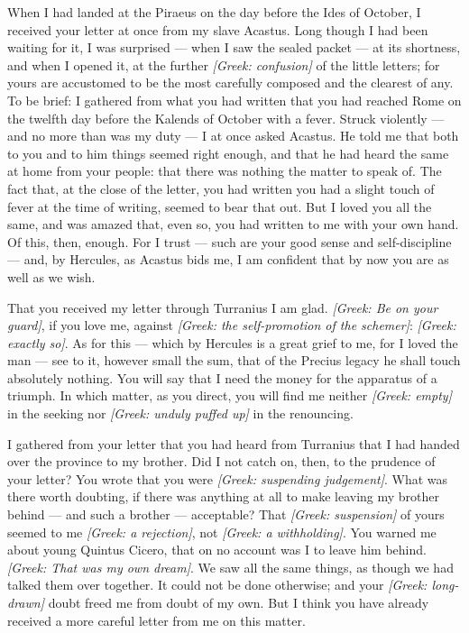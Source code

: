 

 When I had landed at the Piraeus on the day before the Ides of October, I received your letter at once from my slave Acastus. Long though I had been waiting for it, I was surprised --- when I saw the sealed packet --- at its shortness, and when I opened it, at the further \textit{[Greek: confusion]} of the little letters; for yours are accustomed to be the most carefully composed and the clearest of any. To be brief: I gathered from what you had written that you had reached Rome on the twelfth day before the Kalends of October with a fever. Struck violently --- and no more than was my duty --- I at once asked Acastus. He told me that both to you and to him things seemed right enough, and that he had heard the same at home from your people: that there was nothing the matter to speak of. The fact that, at the close of the letter, you had written you had a slight touch of fever at the time of writing, seemed to bear that out. But I loved you all the same, and was amazed that, even so, you had written to me with your own hand. Of this, then, enough. For I trust --- such are your good sense and self-discipline --- and, by Hercules, as Acastus bids me, I am confident that by now you are as well as we wish.

 That you received my letter through Turranius I am glad. \textit{[Greek: Be on your guard]}, if you love me, against \textit{[Greek: the self-promotion of the schemer]}: \textit{[Greek: exactly so]}. As for this --- which by Hercules is a great grief to me, for I loved the man --- see to it, however small the sum, that of the Precius legacy he shall touch absolutely nothing. You will say that I need the money for the apparatus of a triumph. In which matter, as you direct, you will find me neither \textit{[Greek: empty]} in the seeking nor \textit{[Greek: unduly puffed up]} in the renouncing.

 I gathered from your letter that you had heard from Turranius that I had handed over the province to my brother. Did I not catch on, then, to the prudence of your letter? You wrote that you were \textit{[Greek: suspending judgement]}. What was there worth doubting, if there was anything at all to make leaving my brother behind --- and such a brother --- acceptable? That \textit{[Greek: suspension]} of yours seemed to me \textit{[Greek: a rejection]}, not \textit{[Greek: a withholding]}. You warned me about young Quintus Cicero, that on no account was I to leave him behind. \textit{[Greek: That was my own dream]}. We saw all the same things, as though we had talked them over together. It could not be done otherwise; and your \textit{[Greek: long-drawn]} doubt freed me from doubt of my own. But I think you have already received a more careful letter from me on this matter.

